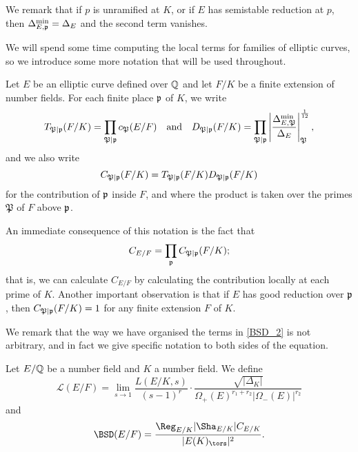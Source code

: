 \begin{enumerate}
    We remark that if $p$ is unramified at $K$, or if $E$ has semistable reduction at $p$, then $\Delta_{E,\mathfrak{p}}^{\min}=\Delta_E$ and the second term vanishes. 
\end{enumerate}

We will spend some time computing the local terms for families of elliptic curves, so we introduce some more notation that will be used throughout. 

\begin{notation}\label{not_contr}
    Let $E$ be an elliptic curve defined over $\mathbb{Q}$ and let $F/K$ be a finite extension of number fields. For each finite place $\mathfrak{p}$ of $K$, we write 
    $$T_{\mathfrak{P}\mid\mathfrak{p}}(F/K)=\prod_{\mathfrak{P}\mid\mathfrak{p}}c_\mathfrak{P}(E/F)\quad\text{and}\quad D_{\mathfrak{P}\mid\mathfrak{p}}(F/K)=\prod_{\mathfrak{P}\mid\mathfrak{p}}\left|\frac{\Delta_{E,\mathfrak{P}}^{\min}}{\Delta_E}\right|_\mathfrak{P}^{\frac{1}{12}},$$
    and we also write 
    $$C_{\mathfrak{P}\mid \mathfrak{p}}(F/K)=T_{\mathfrak{P}\mid \mathfrak{p}}(F/K)D_{\mathfrak{P}\mid \mathfrak{p}}(F/K)$$
    for the contribution of $\mathfrak{p}$ inside $F$, and
    where the product is taken over the primes $\mathfrak{P}$ of $F$ above $\mathfrak{p}$. 
\end{notation}

An immediate consequence of this notation is the fact that 
$$C_{E/F}=\prod_{\mathfrak{p}}C_{\mathfrak{P}\mid \mathfrak{p}}(F/K);$$
that is, we can calculate $C_{E/F}$ by calculating the contribution locally at each prime of $K$. Another important observation is that if $E$ has good reduction over $\mathfrak{p}$, then $C_{\mathfrak{P}\mid\mathfrak{p}}(F/K)=1$ for any finite extension $F$ of $K$. 

We remark that the way we have organised the terms in \eqref{BSD_2} is not arbitrary, and in fact we give specific notation to both sides of the equation. 

\begin{notation}
    Let $E/\mathbb{Q}$ be a number field and $K$ a number field. We define 
    $$\mathcal{L}(E/F)=\lim_{s\to1}\frac{L(E/K,s)}{(s-1)^r}\cdot\frac{\sqrt{|\Delta_K|}}{\Omega_+(E)^{r_1+r_2}|\Omega_-(E)|^{r_2}}$$
    and
    $$\BSD(E/F)=\frac{\Reg_{E/K}|\Sha_{E/K}|C_{E/K}}{|E(K)_{\tors}|^2}.$$
\end{notation}


